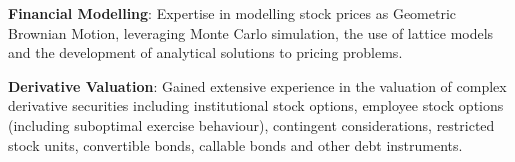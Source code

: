 \begin{cventries}
{\begin{cvitems}
        \item {\textbf{Financial Modelling}: Expertise in modelling stock prices as Geometric Brownian Motion, leveraging Monte Carlo simulation, the use of lattice models and the development of analytical solutions to pricing problems.}
        \item {\textbf{Derivative Valuation}: Gained extensive experience in the valuation of complex derivative securities including institutional stock options, employee stock options (including suboptimal exercise behaviour), contingent considerations, restricted stock units, convertible bonds, callable bonds and other debt instruments.}
      \end{cvitems}
    }
\end{cventries}
